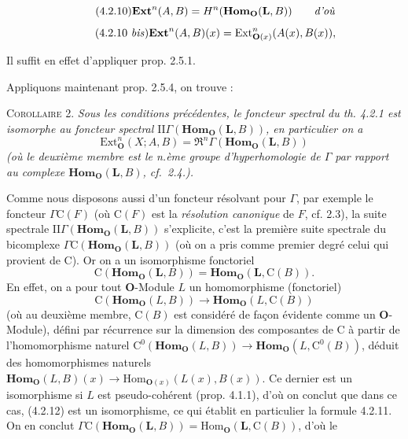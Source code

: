 \clearpage
{}

\[
\tag{4.2.10}
\mathbf{Ext}^n(A,B)=H^n(\mathbf{Hom}_{\mathbf O}(\mathbf{L},B))\qquad\text{\textit{d'où}}
\]
\[
\tag{4.2.10 \textit{bis}}
\mathbf{Ext}^n(A,B)(x)=
\mathrm{Ext}_{{\mathbf O}(x)}^n(A(x),B(x)),
\]

Il suffit en effet d'appliquer prop. 2.5.1.

Appliquons maintenant prop. 2.5.4, on trouve :

\textsc{Corollaire 2.} \textit{Sous les conditions précédentes, le
foncteur spectral du th. \textup{4.2.1} est isomorphe au foncteur spectral
$\mathrm{II}\Gamma(\mathbf{Hom}_{\mathbf O}(\mathbf{L},B))$, en particulier on a}
\[
\mathrm{Ext}_{\mathbf O}^n(X;A,B)=
\mathfrak{R}^n\Gamma(\mathbf{Hom}_{\mathbf O}(\mathbf{L},B))
\]
\textit{\textup{(}où le deuxième membre est le n.ème groupe d'hyperhomologie de
$\Gamma$ par rapport au complexe $\mathbf{Hom}_{\mathbf O}(\mathbf{L},B)$, cf.\ \textup{2.4.).}}

Comme nous disposons aussi d'un foncteur résolvant pour $\Gamma$, par exemple
le foncteur $\Gamma {\mathrm C}(F)$ (où ${\mathrm C}(F)$ est la \textit{résolution canonique} de
$F$, cf. 2.3), la suite spectrale
$\mathrm{II}\Gamma(\mathbf{Hom}_{\mathbf O}(\mathbf{L},B))$ s'explicite, c'est la première suite
spectrale du bicomplexe $\Gamma {\mathrm C}(\mathbf{Hom}_{\mathbf O}(\mathbf{L},B))$ (où on a pris
comme premier degré celui qui provient de ${\mathrm C}$). Or on a un isomorphisme
fonctoriel
\[
\tag{4.2.11}
{\mathrm C}(\mathbf{Hom}_{\mathbf O}(\mathbf{L},B))=
\mathbf{Hom}_{\mathbf O}(\mathbf{L},{\mathrm C}(B)).
\]
En effet, on a pour tout ${\mathbf O}$-Module $L$ un homomorphisme (fonctoriel)
\[
\tag{4.2.12}
{\mathrm C}(\mathbf{Hom}_{\mathbf O}(L,B))\to\mathbf{Hom}_{\mathbf O}(L,{\mathrm C}(B))
\]
(où au deuxième membre, ${\mathrm C}(B)$ est considéré de façon évidente comme un
${\mathbf O}$-Module), défini par récurrence sur la dimension des composantes de ${\mathrm C}$ à
partir de l'homomorphisme naturel
${\mathrm C}^0(\mathbf{Hom}_{\mathbf O}(L,B))\to\mathbf{Hom}_{\mathbf O}(L,{\mathrm C}^0(B))$, déduit des
homomorphismes naturels
$\mathbf{Hom}_{\mathbf O}(L,B)(x)\to
\mathrm{Hom}_{{\mathbf O}(x)}(L(x),B(x))$. Ce dernier est un isomorphisme si $L$ est
pseudo-cohérent (prop. 4.1.1), d'où on conclut que dans ce cas, (4.2.12) est un
isomorphisme, ce qui établit en particulier la formule 4.2.11. On en conclut
$\Gamma {\mathrm C}(\mathbf{Hom}_{\mathbf O}(\mathbf{L},B))=
\mathrm{Hom}_{\mathbf O}(\mathbf{L},{\mathrm C}(B))$, d'où le

